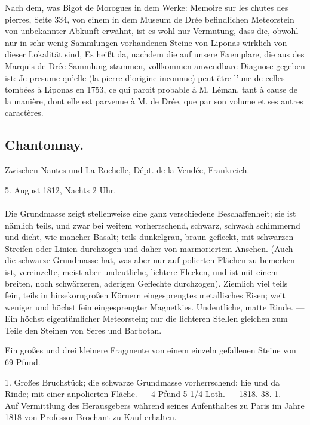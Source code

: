 \documentclass[a4paper, 11pt, oneside, polutonikogreek, german]{article}
\begin{document}
Nach dem, was Bigot de Morogues in dem Werke: Memoire sur les chutes des pierres, Seite 334, von einem in dem Museum de Drée befindlichen Meteorstein von unbekannter Abkunft erwähnt, ist es wohl nur Vermutung, dass die, obwohl nur in sehr wenig Sammlungen vorhandenen Steine von Liponas wirklich von dieser Lokalität sind, Es heißt da, nachdem die auf unsere Exemplare, die aus des Marquis de Drée Sammlung stammen, vollkommen anwendbare Diagnose gegeben ist: Je presume qu'elle (la pierre d'origine inconnue) peut être l'une de celles tombées à Liponas en 1753, ce qui paroit probable à M. Léman, tant à cause de la manière, dont elle est parvenue à M. de Drée, que par son volume et ses autres caractères.
\subsection{Chantonnay.}
\begin{center}
\small
Zwischen Nantes und La Rochelle, Dépt. de la Vendée, Frankreich.

5. August 1812, Nachts 2 Uhr.
\end{center}
\paragraph{}
Die Grundmasse zeigt stellenweise eine ganz verschiedene Beschaffenheit; sie ist nämlich teils, und zwar bei weitem vorherrschend, schwarz, schwach schimmernd und dicht, wie mancher Basalt; teils dunkelgrau, braun gefleckt, mit schwarzen Streifen oder Linien durchzogen und daher von marmoriertem Ansehen. (Auch die schwarze Grundmasse hat, was aber nur auf polierten Flächen zu bemerken ist, vereinzelte, meist aber undeutliche, lichtere Flecken, und ist mit einem breiten, noch schwärzeren, aderigen Geflechte durchzogen). Ziemlich viel teils fein, teils in hirsekorngroßen Körnern eingesprengtes metallisches Eisen; weit weniger und höchst fein eingesprengter Magnetkies. Undeutliche, matte Rinde. — Ein höchst eigentümlicher Meteorstein; nur die lichteren Stellen gleichen zum Teile den Steinen von Seres und Barbotan.

Ein großes und drei kleinere Fragmente von einem einzeln gefallenen Steine von 69 Pfund.

1. Großes Bruchstück; die schwarze Grundmasse vorherrschend; hie und da Rinde; mit einer anpolierten Fläche. — 4 Pfund 5 1/4 Loth. — 1818. 38. 1. — Auf Vermittlung des Herausgebers während seines Aufenthaltes zu Paris im Jahre 1818 von Professor Brochant zu Kauf erhalten.
\end{document}
